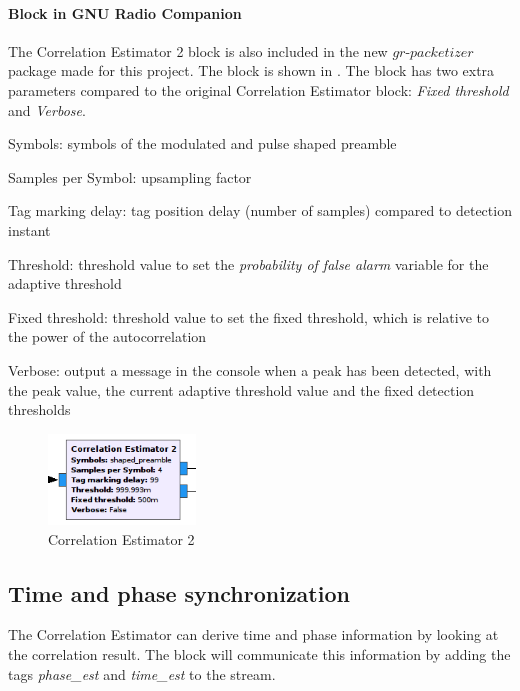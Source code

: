 \paragraph*{Block in GNU Radio Companion}
The Correlation Estimator 2 block is also included in the new $gr$-$packetizer$ package made for this project. The block is shown in . The block has two extra parameters compared to the original Correlation Estimator block: \textit{Fixed threshold} and \textit{Verbose}.
\begin{tight_itemize}
\item Symbols: symbols of the modulated and pulse shaped preamble
\item Samples per Symbol: upsampling factor 
\item Tag marking delay: tag position delay (number of samples) compared to detection instant
\item Threshold: threshold value to set the \textit{probability of false alarm} variable for the adaptive threshold
\item Fixed threshold: threshold value to set the fixed threshold, which is relative to the power of the autocorrelation
\item Verbose: output a message in the console when a peak has been detected, with the peak value, the current adaptive threshold value and the fixed detection thresholds
\end{tight_itemize}


\begin{figure}[H]
    \centering
    \includegraphics[width=0.35\textwidth]{img_commchain/corr_est_2.png}
    \caption{{Correlation Estimator 2}}
    \label{fig:corr_est_2}
\end{figure}

\subsection{Time and phase synchronization} \label{section_time_phase_sync}
The Correlation Estimator can derive time and phase information by looking at the correlation result. The block will communicate this information by adding the tags \textit{phase\_est} and \textit{time\_est} to the stream.\medskip


